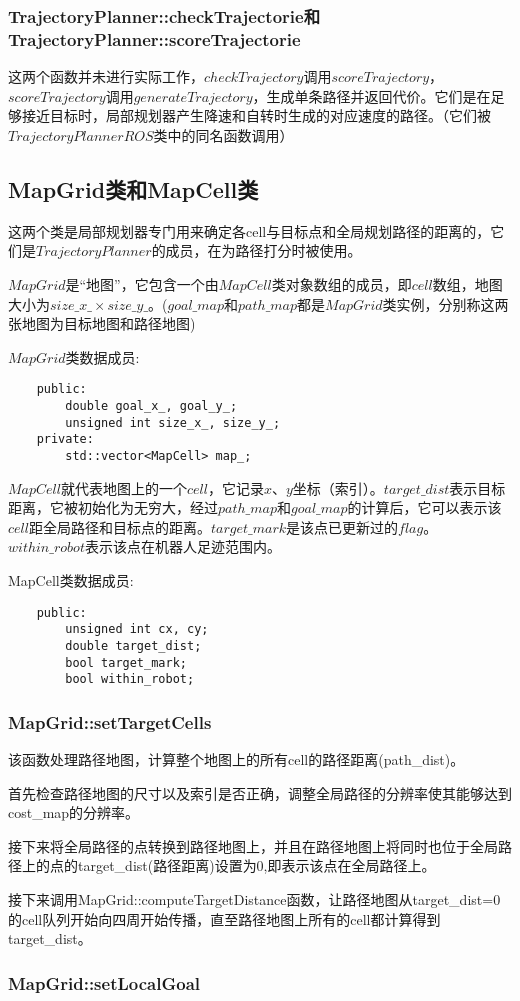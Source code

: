 \documentclass[9pt, oneside]{book}
\begin{document}
\subsubsection{TrajectoryPlanner::checkTrajectorie和TrajectoryPlanner::scoreTrajectorie}

这两个函数并未进行实际工作，$checkTrajectory$调用$scoreTrajectory$，$scoreTrajectory$调用$generateTrajectory$，生成单条路径并返回代价。它们是在足够接近目标时，局部规划器产生降速和自转时生成的对应速度的路径。（它们被$TrajectoryPlannerROS$类中的同名函数调用）

\subsection{MapGrid类和MapCell类}

这两个类是局部规划器专门用来确定各cell与目标点和全局规划路径的距离的，它们是$TrajectoryPlanner$的成员，在为路径打分时被使用。

$MapGrid$是“地图”，它包含一个由$MapCell$类对象数组的成员，即$cell$数组，地图大小为$size\_x\_ × size\_y\_$。($goal\_map$和$path\_map$都是$MapGrid$类实例，分别称这两张地图为目标地图和路径地图)

$MapGrid$类数据成员:

\small
\begin{verbatim}
    public:
        double goal_x_, goal_y_; 
        unsigned int size_x_, size_y_; 
    private:
        std::vector<MapCell> map_; 
\end{verbatim}
\normalsize

$MapCell$就代表地图上的一个$cell$，它记录$x$、$y$坐标（索引）。$target\_dist$表示目标距离，它被初始化为无穷大，经过$path\_map$和$goal\_map$的计算后，它可以表示该$cell$距全局路径和目标点的距离。$target\_mark$是该点已更新过的$flag$。$within\_robot$表示该点在机器人足迹范围内。

MapCell类数据成员:

\small
\begin{verbatim}
    public:
        unsigned int cx, cy;
        double target_dist;
        bool target_mark;
        bool within_robot;
\end{verbatim}
\normalsize

\subsubsection{MapGrid::setTargetCells}

该函数处理路径地图，计算整个地图上的所有cell的路径距离(path_dist)。

首先检查路径地图的尺寸以及索引是否正确，调整全局路径的分辨率使其能够达到cost_map的分辨率。

接下来将全局路径的点转换到路径地图上，并且在路径地图上将同时也位于全局路径上的点的target_dist(路径距离)设置为0,即表示该点在全局路径上。

接下来调用MapGrid::computeTargetDistance函数，让路径地图从target_dist=0的cell队列开始向四周开始传播，直至路径地图上所有的cell都计算得到target_dist。

\subsubsection{MapGrid::setLocalGoal}
\end{document}
